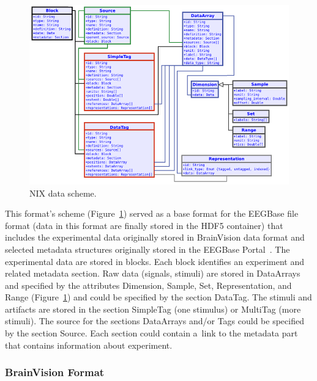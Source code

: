 \documentclass[conference]{IEEEtran}
\begin{document}
\begin{figure}[h]
	\centering
	\includegraphics[scale=0.9]{obrazky/NIX_scheme.png}
	\caption{NIX data scheme. \cite{pandora}}
	\label{NIX_scheme}
\end{figure}


This format's scheme (Figure~\ref{NIX_scheme}) served as a base format for the EEGBase file format (data in this format are finally stored in the HDF5 container) that includes the experimental data originally stored in BrainVision data format and selected metadata structures originally stored in the EEGBase Portal~\cite{eegportal}. The experimental data are stored in blocks. Each block identifies an experiment and related metadata section. Raw data (signals, stimuli) are stored in DataArrays and specified by the attributes Dimension, Sample, Set, Representation, and Range (Figure~\ref{NIX_scheme}) and could be specified by the section DataTag. The stimuli and artifacts are stored in the section SimpleTag (one stimulus) or MultiTag (more stimuli). The source for the sections DataArrays and/or Tags could be specified by the section Source. Each section could contain a~link to the metadata part that contains information about experiment.

\subsubsection{BrainVision Format}
\end{document}
